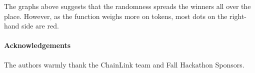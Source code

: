 \documentclass[runningheads]{llncs}
\begin{document}
The graphs above suggests that the randomness spreads the winners all over the place. However, as the function weighs more on tokens, most dots on the right-hand side are red.







\paragraph*{Acknowledgements} 
The authors warmly thank the ChainLink team and Fall Hackathon Sponsors.

%
%
% 
% 
%



\end{document}
